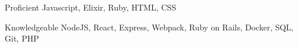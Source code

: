 

\begin{cvskills}

\cvskill
{Proficient} %
{Javascript, Elixir, Ruby, HTML, CSS} %

\cvskill
{Knowledgeable} %
{NodeJS, React, Express, Webpack, Ruby on Rails, Docker, SQL, Git, PHP} %

\end{cvskills}
